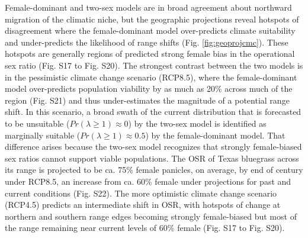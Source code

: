 \documentclass[9pt,twocolumn,twoside,lineno]{pnas-new}
\begin{document}
Female-dominant and two-sex models are in broad agreement about northward migration of the climatic niche, but the geographic projections reveal hotspots of disagreement where the female-dominant model over-predicts climate suitability and under-predicts the likelihood of range shifts (Fig. \ref{fig:geoprojcmc}). 
These hotspots are generally regions of predicted strong female bias in the operational sex ratio (Fig. S17 to Fig. S20). 
The strongest contrast between the two models is in the pessimistic climate change scenario (RCP8.5), where the female-dominant model over-predicts population viability by as much as 20\% across much of the region (Fig. S21) and thus under-estimates the magnitude of a potential range shift. 
In this scenario, a broad swath of the current distribution that is forecasted to be unsuitable ($Pr(\lambda \ge 1) \approx 0$) by the two-sex model is identified as marginally suitable ($Pr(\lambda \ge 1) \approx 0.5$) by the female-dominant model. 
That difference arises because the two-sex model recognizes that strongly female-biased sex ratios cannot support viable populations. 
The OSR of Texas bluegrass across its range is projected to be ca. 75\% female panicles, on average, by end of century under RCP8.5, an increase from ca. 60\% female under projections for past and current conditions (Fig. S22). 
The more optimistic climate change scenario (RCP4.5) predicts an intermediate shift in OSR, with hotspots of change at northern and southern range edges becoming strongly female-biased but most of the range remaining near current levels of 60\% female (Fig. S17 to Fig. S20). 
\end{document}
